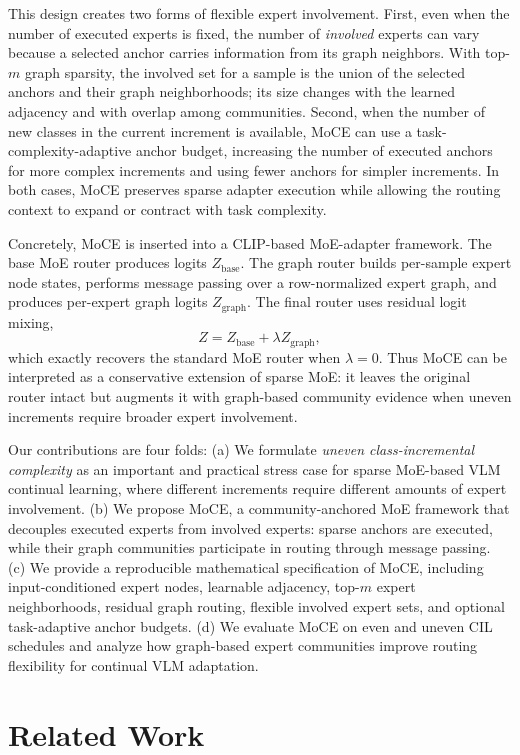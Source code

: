 \documentclass{article}
\theoremstyle{definition}
\theoremstyle{remark}
\begin{document}
This design creates two forms of flexible expert involvement. First, even when the number of executed experts is fixed, the number of \emph{involved} experts can vary because a selected anchor carries information from its graph neighbors. With top-$m$ graph sparsity, the involved set for a sample is the union of the selected anchors and their graph neighborhoods; its size changes with the learned adjacency and with overlap among communities. Second, when the number of new classes in the current increment is available, MoCE can use a task-complexity-adaptive anchor budget, increasing the number of executed anchors for more complex increments and using fewer anchors for simpler increments. In both cases, MoCE preserves sparse adapter execution while allowing the routing context to expand or contract with task complexity.

Concretely, MoCE is inserted into a CLIP-based MoE-adapter framework. The base MoE router produces logits $Z_{\mathrm{base}}$. The graph router builds per-sample expert node states, performs message passing over a row-normalized expert graph, and produces per-expert graph logits $Z_{\mathrm{graph}}$. The final router uses residual logit mixing,
\[
Z = Z_{\mathrm{base}} + \lambda Z_{\mathrm{graph}},
\]
which exactly recovers the standard MoE router when $\lambda=0$. Thus MoCE can be interpreted as a conservative extension of sparse MoE: it leaves the original router intact but augments it with graph-based community evidence when uneven increments require broader expert involvement.

Our contributions are four folds: (a) We formulate \emph{uneven class-incremental complexity} as an important and practical stress case for sparse MoE-based VLM continual learning, where different increments require different amounts of expert involvement. (b) We propose MoCE, a community-anchored MoE framework that decouples executed experts from involved experts: sparse anchors are executed, while their graph communities participate in routing through message passing. (c) We provide a reproducible mathematical specification of MoCE, including input-conditioned expert nodes, learnable adjacency, top-$m$ expert neighborhoods, residual graph routing, flexible involved expert sets, and optional task-adaptive anchor budgets. (d) We evaluate MoCE on even and uneven CIL schedules and analyze how graph-based expert communities improve routing flexibility for continual VLM adaptation.


\section{Related Work}
\end{document}
